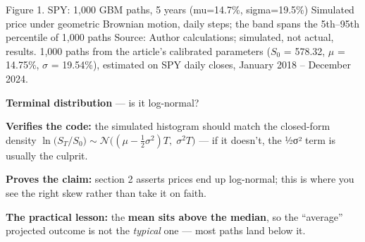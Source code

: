 \documentclass{pyportfolios-note}
\begin{document}

  {Figure 1. SPY: 1,000 GBM paths, 5 years (mu=14.7\%, sigma=19.5\%)}
  {Simulated price under geometric Brownian motion, daily steps; the band spans
   the 5th–95th percentile of 1,000 paths}
  {Source: Author calculations; simulated, not actual, results. 1,000 paths from
   the article's calibrated parameters ($S_0$ = 578.32, $\mu$ = 14.75\%,
   $\sigma$ = 19.54\%), estimated on SPY daily closes, January 2018 – December 2024.}

\noteneedroom{170bp}
\begin{notebullets}
\item \textbf{Terminal distribution} — is it log-normal?
      \begin{notesubbullets}
      \item \textbf{Verifies the code:} the simulated histogram should match the
            closed-form density
            $\ln\!\big(S_T/S_0\big) \sim \mathcal{N}\big((\mu - \tfrac{1}{2}\sigma^2)T,\; \sigma^2 T\big)$
            — if it doesn't, the ½σ² term is usually the culprit.
      \item \textbf{Proves the claim:} section 2 asserts prices end up
            log-normal; this is where you see the right skew rather than take it
            on faith.
      \item \textbf{The practical lesson:} the \textbf{mean sits above the
            median}, so the ``average'' projected outcome is not the
            \textit{typical} one — most paths land below it.
      \end{notesubbullets}
\end{notebullets}
\end{document}
